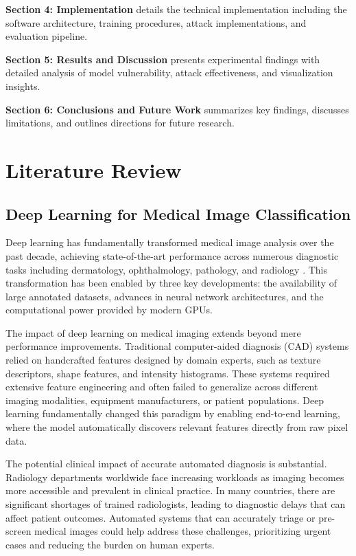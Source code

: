 \documentclass[12pt,a4paper]{article}
\begin{document}
\textbf{Section 4: Implementation} details the technical implementation including the software architecture, training procedures, attack implementations, and evaluation pipeline.

\textbf{Section 5: Results and Discussion} presents experimental findings with detailed analysis of model vulnerability, attack effectiveness, and visualization insights.

\textbf{Section 6: Conclusions and Future Work} summarizes key findings, discusses limitations, and outlines directions for future research.

\section{Literature Review}
\label{sec:literature-review}

\subsection{Deep Learning for Medical Image Classification}

Deep learning has fundamentally transformed medical image analysis over the past decade, achieving state-of-the-art performance across numerous diagnostic tasks including dermatology, ophthalmology, pathology, and radiology \cite{litjens2017}. This transformation has been enabled by three key developments: the availability of large annotated datasets, advances in neural network architectures, and the computational power provided by modern GPUs.

The impact of deep learning on medical imaging extends beyond mere performance improvements. Traditional computer-aided diagnosis (CAD) systems relied on handcrafted features designed by domain experts, such as texture descriptors, shape features, and intensity histograms. These systems required extensive feature engineering and often failed to generalize across different imaging modalities, equipment manufacturers, or patient populations. Deep learning fundamentally changed this paradigm by enabling end-to-end learning, where the model automatically discovers relevant features directly from raw pixel data.

The potential clinical impact of accurate automated diagnosis is substantial. Radiology departments worldwide face increasing workloads as imaging becomes more accessible and prevalent in clinical practice. In many countries, there are significant shortages of trained radiologists, leading to diagnostic delays that can affect patient outcomes. Automated systems that can accurately triage or pre-screen medical images could help address these challenges, prioritizing urgent cases and reducing the burden on human experts.
\end{document}
